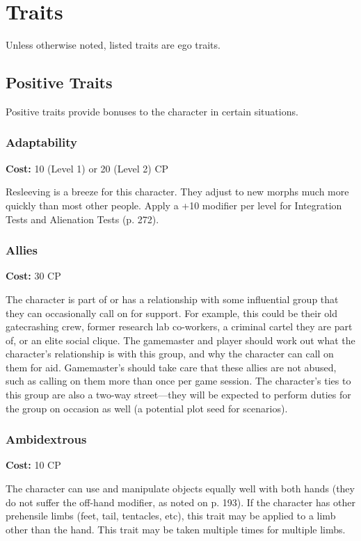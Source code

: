 \section{Traits}
Unless otherwise noted, listed traits are ego traits.

\subsection{Positive Traits}
Positive traits provide bonuses to the character in certain situations.

\subsubsection{Adaptability}
\textbf{Cost:} 10 (Level 1) or 20 (Level 2) CP

Resleeving is a breeze for this character. They adjust to new morphs much more
quickly than most other people. Apply a +10 modifier per level for Integration
Tests and Alienation Tests (p. 272).

\subsubsection{Allies}
\textbf{Cost:} 30 CP

The character is part of or has a relationship with some influential group that
they can occasionally call on for support. For example, this could be their old
gatecrashing crew, former research lab co-workers, a criminal cartel they are
part of, or an elite social clique. The gamemaster and player should work out
what the character’s relationship is with this group, and why the character can
call on them for aid.  Gamemaster’s should take care that these allies are not
abused, such as calling on them more than once per game session. The
character’s ties to this group are also a two-way street—they will be expected
to perform duties for the group on occasion as well (a potential plot seed for
scenarios).

\subsubsection{Ambidextrous}
\textbf{Cost:} 10 CP

The character can use and manipulate objects equally well with both hands (they
do not suffer the off-hand modifier, as noted on p. 193). If the character
has other prehensile limbs (feet, tail, tentacles, etc), this trait may be
applied to a limb other than the hand. This trait may be taken multiple times
for multiple limbs.


